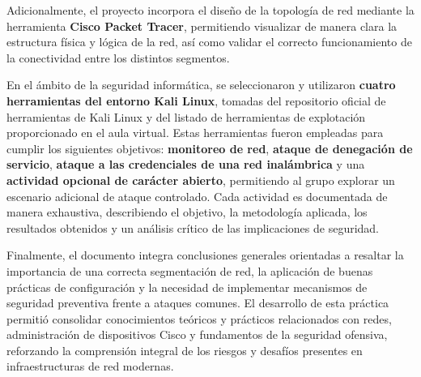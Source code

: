 Adicionalmente, el proyecto incorpora el diseño de la topología de red mediante la herramienta \textbf{Cisco Packet Tracer}, permitiendo visualizar de manera clara la estructura física y lógica de la red, así como validar el correcto funcionamiento de la conectividad entre los distintos segmentos.

En el ámbito de la seguridad informática, se seleccionaron y utilizaron \textbf{cuatro herramientas del entorno Kali Linux}, tomadas del repositorio oficial de herramientas de Kali Linux y del listado de herramientas de explotación proporcionado en el aula virtual. Estas herramientas fueron empleadas para cumplir los siguientes objetivos: \textbf{monitoreo de red}, \textbf{ataque de denegación de servicio}, \textbf{ataque a las credenciales de una red inalámbrica} y una \textbf{actividad opcional de carácter abierto}, permitiendo al grupo explorar un escenario adicional de ataque controlado. Cada actividad es documentada de manera exhaustiva, describiendo el objetivo, la metodología aplicada, los resultados obtenidos y un análisis crítico de las implicaciones de seguridad.

Finalmente, el documento integra conclusiones generales orientadas a resaltar la importancia de una correcta segmentación de red, la aplicación de buenas prácticas de configuración y la necesidad de implementar mecanismos de seguridad preventiva frente a ataques comunes. El desarrollo de esta práctica permitió consolidar conocimientos teóricos y prácticos relacionados con redes, administración de dispositivos Cisco y fundamentos de la seguridad ofensiva, reforzando la comprensión integral de los riesgos y desafíos presentes en infraestructuras de red modernas.
